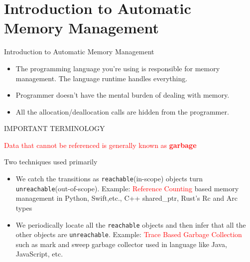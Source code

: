 \documentclass[
  10pt,
  ignorenonframetext,
]{beamer}
\providecommand{\tightlist}{%
  \setlength{\itemsep}{0pt}\setlength{\parskip}{0pt}}
\begin{document}
\hypertarget{introduction-to-automatic-memory-management}{%
\section{Introduction to Automatic Memory
Management}\label{introduction-to-automatic-memory-management}}

\begin{frame}{Introduction to Automatic Memory
Management}
\pause

\begin{itemize}
\tightlist
\item
  The programming language you're using is
  responsible for memory management. The language
  runtime handles everything.
\end{itemize}

\pause

\begin{itemize}
\tightlist
\item
  Programmer doesn't have the mental burden of
  dealing with memory.
\end{itemize}

\pause

\begin{itemize}
\tightlist
\item
  All the allocation/deallocation calls are hidden
  from the programmer.
\end{itemize}

\pause

\begin{block}{\centering IMPORTANT TERMINOLOGY}
\protect\hypertarget{important-terminology-1}{}
\pause

\begin{center}
\textcolor{red}{Data that cannot be referenced is generally known as \textbf{garbage}}
\end{center}
\pause
\end{block}

\begin{block}{\centering Two techniques used
primarily}
\protect\hypertarget{two-techniques-used-primarily}{}
\pause

\begin{itemize}
\tightlist
\item
  We catch the transitions as
  \texttt{reachable}(in-scope) objects turn
  \texttt{unreachable}(out-of-scope).
  \pause Example:
  \textcolor{red}{Reference Counting} based memory
  management in Python, Swift,etc., C++
  shared\_ptr, Rust's Rc and Arc types
\end{itemize}

\pause

\begin{itemize}
\tightlist
\item
  We periodically locate all the
  \texttt{reachable} objects and then infer that
  all the other objects are \texttt{unreachable}.
  \pause Example:
  \textcolor{red}{Trace Based Garbage Collection}
  such as mark and sweep garbage collector used in
  language like Java, JavaScript, etc.
\end{itemize}
\end{block}
\end{frame}
\end{document}
